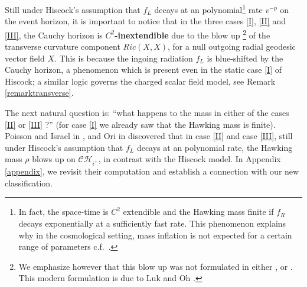 \documentclass[10pt,a4paper]{article}
\theoremstyle{plain}
\theoremstyle{remark}
\theoremstyle{definition}
\theoremstyle{plain}
\theoremstyle{remark}
\theoremstyle{definition}
\newcommand{\CH}{\mathcal{CH}_{i^+}}
\numberwithin{equation}{section}
\begin{document}
Still under Hiscock's assumption that $f_L$ decays at an polynomial\footnote{In fact, the space-time is $C^2$ extendible and the Hawking mass finite if $f_R$ decays exponentially at a sufficiently fast rate. This phenomenon explains why in the cosmological setting, mass inflation is not expected for a certain range of parameters  c.f.\  \cite{Costa}.} rate $v^{-p}$ on the event horizon\color{black}, it is important to notice that in the three cases \ref{I}, \ref{II} and \ref{III}, the Cauchy horizon is \textbf{$C^2$-inextendible} due to the blow up \footnote{We emphasize however that this blow up was not formulated in either \cite{Poisson}, \cite{PoissonIsrael} or \cite{Ori}. This modern formulation is due to Luk and Oh \cite{JonathanStab}.} of the transverse curvature component $Ric(X,X)$, for a null outgoing radial geodesic vector field $X$. This is because the ingoing radiation $f_L$ is blue-shifted by the Cauchy horizon, a phenomenon which is present even in the static case \ref{I} of Hiscock; a similar logic governs the charged scalar field model, see  Remark \ref{remarktransverse}.





 The next natural question is: ``what happens to the mass in either of the cases \ref{II} or \ref{III} ?'' (for case \ref{I} we already saw that the Hawking mass is finite). \color{black}Poisson and Israel in \cite{Poisson}, \cite{PoissonIsrael} and Ori in \cite{Ori} discovered that in case \ref{II} and case \ref{III}, still under Hiscock's assumption that $f_L$ decays at an polynomial rate\color{black}, the Hawking mass $\rho$ blows up on $\CH$, in contrast with the Hiscock model. In Appendix \ref{appendix}, we revisit their computation and establish a connection with our new classification. 
\end{document}
